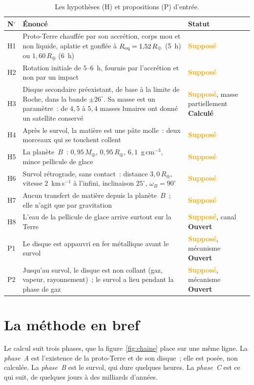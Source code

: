 \documentclass[11pt,a4paper]{article}
\newcommand{\Rt}{\ensuremath{R_\oplus}}
\newcommand{\Mt}{\ensuremath{M_\oplus}}
\newcommand{\Req}{\ensuremath{R_{\rm eq}}}
\newcommand{\stCalc}{\textcolor{vert}{\textbf{Calculé}}}
\newcommand{\stSup}{\textcolor{orange}{\textbf{Supposé}}}
\newcommand{\stOuv}{\textcolor{gris}{\textbf{Ouvert}}}
\begin{document}
\begin{table}[htbp]
\centering
\caption{Les hypothèses (H) et propositions (P) d'entrée.\label{tab:hypotheses}}
\small
\begin{tabular}{>{\raggedright\arraybackslash}p{0.9cm}>{\raggedright\arraybackslash}p{10.6cm}>{\raggedright\arraybackslash}p{2.9cm}}
\toprule
N$^\circ$ & Énoncé & Statut \\
\midrule
H1 & Proto-Terre chauffée par son accrétion, corps mou et non liquide, aplatie et gonflée à $\Req=1{,}52\,\Rt$ (5~h) ou $1{,}60\,\Rt$ (6~h) & \stSup \\
H2 & Rotation initiale de $5$--$6$~h, fournie par l'accrétion et non par un impact & \stSup \\
H3 & Disque secondaire préexistant, de base à la limite de Roche, dans la bande $\pm26^\circ$. Sa masse est un paramètre~: de $4{,}5$ à $5{,}4$ masses lunaires ont donné un satellite conservé & \stSup, masse partiellement \stCalc \\
H4 & Après le survol, la matière est une pâte molle~: deux morceaux qui se touchent collent & \stSup \\
H5 & La planète~$B$~: $0{,}95\,\Mt$, $0{,}95\,\Rt$, $6{,}1$~g\,cm$^{-3}$, mince pellicule de glace & \stSup \\
H6 & Survol rétrograde, sans contact~: distance $3{,}0\,\Rt$, vitesse $2$~km\,s$^{-1}$ à l'infini, inclinaison $25^\circ$, $\omega_B=90^\circ$ & \stSup \\
H7 & Aucun transfert de matière depuis la planète~$B$~; elle n'agit que par gravitation & \stSup \\
H8 & L'eau de la pellicule de glace arrive surtout sur la Terre & \stSup, canal \stOuv \\
P1 & Le disque est appauvri en fer métallique avant le survol & \stSup, mécanisme \stOuv \\
P2 & Jusqu'au survol, le disque est non collant (gaz, vapeur, rayonnement)~; le survol a lieu pendant la phase de gaz & \stSup, mécanisme \stOuv \\
\bottomrule
\end{tabular}
\end{table}

\section{La méthode en bref}
\label{sec:methode}

Le calcul suit trois phases, que la figure~\ref{fig:chaine} place sur une même ligne. La \emph{phase~A} est l'existence de la proto-Terre et de son disque~; elle est posée, non calculée. La \emph{phase~B} est le survol, qui dure quelques heures. La \emph{phase~C} est ce qui suit, de quelques jours à des milliards d'années.
\end{document}
